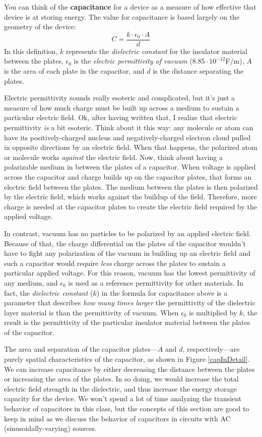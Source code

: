 \par
You can think of the \textbf{capacitance} for a device as a measure of how effective that device is at storing energy. The value for capacitance is based largely on the geometry of the device:
$$
C = \frac{k \cdot \epsilon_0 \cdot A}{d}
$$
In this definition, $k$ represents the \textit{dielectric constant} for the insulator material between the plates, $\epsilon_0$ is the \textit{electric permittivity of vacuum} ($8.85 \cdot 10^{-12}$F/m), $A$ is the area of each plate in the capacitor, and $d$ is the distance separating the plates. 
\par
Electric permittivity sounds really esoteric and complicated, but it's just a measure of how much charge must be built up across a medium to sustain a particular electric field. Ok, after having written that, I realize that electric permittivity \textit{is} a bit esoteric. Think about it this way: any molecule or atom can have its positively-charged nucleus and negatively-charged electron cloud pulled in opposite directions by an electric field. When that happens, the polarized atom or molecule works \textit{against} the electric field. Now, think about having a polarizable medium in between the plates of a capacitor. When voltage is applied across the capacitor and charge builds up on the capacitor plates, that forms an electric field between the plates. The medium between the plates is then polarized by the electric field, which works against the buildup of the field. Therefore, more charge is needed at the capacitor plates to create the electric field required by the applied voltage. 
\par
In contrast, vacuum has no particles to be polarized by an applied electric field. Because of that, the charge differential on the plates of the capacitor wouldn't have to fight any polarization of the vacuum in building up an electric field and such a capacitor would require \textit{less} charge across the plates to sustain a particular applied voltage. For this reason, vacuum has the lowest permittivity of any medium, and $\epsilon_0$ is used as a reference permittivity for other materials. In fact, the \textit{dielectric constant} ($k$) in the formula for capacitance above is a parameter that describes \textit{how many times larger} the permittivity of the dielectric layer material is than the permittivity of vacuum. When $\epsilon_0$ is multiplied by $k$, the result is the permittivity of the particular insulator material between the plates of the capacitor.
\par
The area and separation of the capacitor plates---$A$ and $d$, respectively---are purely spatial characteristics of the capacitor, as shown in Figure \ref{capInDetail}. We can increase capacitance by either decreasing the distance between the plates or increasing the area of the plates. In so doing, we would increase the total electric field strength in the dielectric, and thus increase the energy storage capacity for the device. We won't spend a lot of time analyzing the transient behavior of capacitors in this class, but the concepts of this section are good to keep in mind as we discuss the behavior of capacitors in circuits with AC (sinusoidally-varying) sources.
